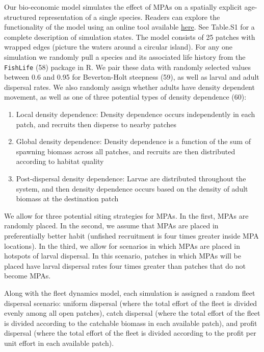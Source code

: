 \documentclass[9pt,twocolumn,twoside,lineno]{pnas-new}
\begin{document}
Our bio-economic model simulates the effect of MPAs on a spatially
explicit age-structured representation of a single species. Readers can
explore the functionality of the model using an online tool available
\href{https://danovando.shinyapps.io/simmpa/}{here}. See Table.S1 for a
complete description of simulation states. The model consists of 25
patches with wrapped edges (picture the waters around a circular
island). For any one simulation we randomly pull a species and its
associated life history from the \texttt{FishLife} (58) package in R. We
pair these data with randomly selected values between 0.6 and 0.95 for
Beverton-Holt steepness (59), as well as larval and adult dispersal
rates. We also randomly assign whether adults have density dependent
movement, as well as one of three potential types of density dependence
(60):

\begin{enumerate}
\def\labelenumi{\arabic{enumi}.}
\item
  Local density dependence: Density dependence occurs independently in
  each patch, and recruits then disperse to nearby patches
\item
  Global density dependence: Density dependence is a function of the sum
  of spawning biomass across all patches, and recruits are then
  distributed according to habitat quality
\item
  Post-dispersal density dependence: Larvae are distributed throughout
  the system, and then density dependence occurs based on the density of
  adult biomass at the destination patch
\end{enumerate}

We allow for three potential siting strategies for MPAs. In the first,
MPAs are randomly placed. In the second, we assume that MPAs are placed
in preferentially better habit (unfished recruitment is four times
greater inside MPA locations). In the third, we allow for scenarios in
which MPAs are placed in hotspots of larval dispersal. In this scenario,
patches in which MPAs will be placed have larval dispersal rates four
times greater than patches that do not become MPAs.

Along with the fleet dynamics model, each simulation is assigned a
random fleet dispersal scenario: uniform dispersal (where the total
effort of the fleet is divided evenly among all open patches), catch
dispersal (where the total effort of the fleet is divided according to
the catchable biomass in each available patch), and profit dispersal
(where the total effort of the fleet is divided according to the profit
per unit effort in each available patch).
\end{document}
